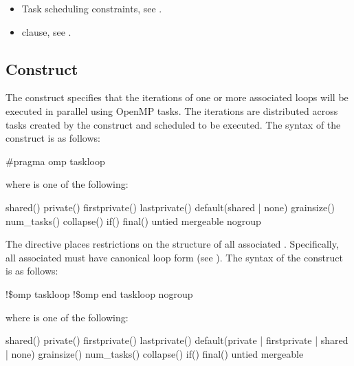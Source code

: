 \crossreferences
\begin{itemize}
\item Task scheduling constraints, see . 
\item {} clause, see .
\end{itemize}











\subsection{ Construct}
\label{subsec:taskloop Construct}
\summary
The  construct specifies that the iterations of one or more associated loops will be executed in parallel using OpenMP tasks. The iterations are distributed across tasks created by the construct and scheduled to be executed.
\syntax
\ccppspecificstart
The syntax of the  construct is as follows:
\begin{boxedcode}
\#pragma omp taskloop 
\end{boxedcode}
where  is one of the following:
\begin{indentedcodelist}
shared()
private()
firstprivate()
lastprivate()
default(shared | none)
grainsize()
num_tasks()
collapse()
if()
final()
untied
mergeable
nogroup
\end{indentedcodelist}

The  directive places restrictions on the structure of all associated . Specifically, all associated  must have canonical loop form (see ).
\ccppspecificend
\fortranspecificstart
The syntax of the  construct is as follows:
\begin{boxedcode}
!\$omp taskloop 
\plc{[}!\$omp end taskloop \plc{[}nogroup\plc{]]}
\end{boxedcode}
where  is one of the following:
\begin{indentedcodelist}
shared()
private()
firstprivate()
lastprivate()
default(private | firstprivate | shared | none)
grainsize()
num_tasks()
collapse()
if()
final()
untied
mergeable
\end{indentedcodelist}

